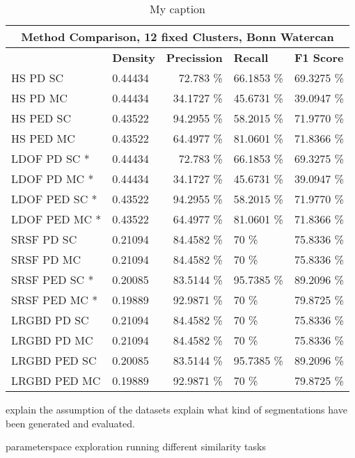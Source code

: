 \begin{table}[]
\centering
\begin{tabular}{|l|l|r|l|l|}
\hline
\multicolumn{5}{|c|}{Method Comparison, 12 fixed Clusters, Bonn Watercan}                        \\ \hline
              & \textbf{Density} & \textbf{Precission} & \textbf{Recall} & \textbf{F1 Score} \\ \hline
HS PD SC & 0.44434 & 72.783 \%   & 66.1853 \%     & 69.3275 \%  \\ \hline
HS PD MC & 0.44434 & 34.1727 \%   & 45.6731 \%     & 39.0947 \%  \\ \hline              
HS PED SC & 0.43522 & 94.2955 \%   & 58.2015 \%     & 71.9770 \%  \\ \hline
HS PED MC & 0.43522 & 64.4977 \%   & 81.0601 \%     & 71.8366 \%  \\ \hline            
LDOF PD SC * & 0.44434 & 72.783 \%   & 66.1853 \%     & 69.3275 \%  \\ \hline
LDOF PD MC * & 0.44434 & 34.1727 \%   & 45.6731 \%     & 39.0947 \%  \\ \hline              
LDOF PED SC * & 0.43522 & 94.2955 \%   & 58.2015 \%     & 71.9770 \%  \\ \hline
LDOF PED MC * & 0.43522 & 64.4977 \%   & 81.0601 \%     & 71.8366 \%  \\ \hline
SRSF PD SC & 0.21094 & 84.4582 \%   & 70 \%     & 75.8336 \%  \\ \hline
SRSF PD MC & 0.21094 & 84.4582 \%   & 70 \%     & 75.8336 \%  \\ \hline
SRSF PED SC * & 0.20085 & 83.5144 \%   & 95.7385 \%     & 89.2096 \%  \\ \hline
SRSF PED MC * & 0.19889 & 92.9871 \%   & 70 \%     & 79.8725 \%  \\ \hline
LRGBD PD SC & 0.21094 & 84.4582 \%   & 70 \%     & 75.8336 \%  \\ \hline
LRGBD PD MC & 0.21094 & 84.4582 \%   & 70 \%     & 75.8336 \%  \\ \hline
LRGBD PED SC & 0.20085 & 83.5144 \%   & 95.7385 \%     & 89.2096 \%  \\ \hline
LRGBD PED MC & 0.19889 & 92.9871 \%   & 70 \%     & 79.8725 \%  \\ \hline
\end{tabular}
\caption[Method Comparision Bonn Watercan]{My caption}
\label{tab:bonn_wc_methods}
\end{table}


explain the assumption of the datasets
explain what kind of segmentations have been generated and evaluated.







parameterspace exploration
running different similarity tasks




